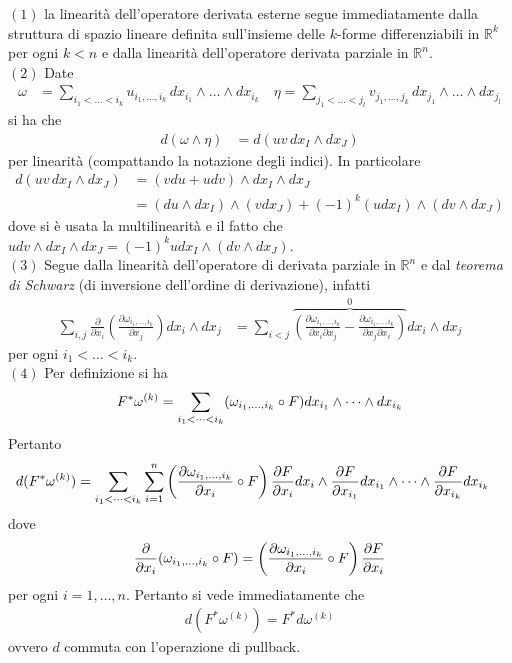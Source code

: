 \documentclass[oneside, 11pt]{amsbook}
\makeatletter
\newcommand{\0}{{(0)}}
\newcommand{\3}{{(3)}}
\theoremstyle{colonplain}
\theoremstyle{colondefinition}
\theoremstyle{colonremark}
\numberwithin{equation}{chapter}
\renewcommand{\proofname}{Dimostrazione}
\renewenvironment{proof}[1][\proofname]{\par
  \pushQED{\qed}%
  \normalfont \topsep6\p@\@plus6\p@\relax
  \trivlist
  \item[\hskip\labelsep\bfseries #1:]\ignorespaces
}{%
  \popQED\endtrivlist\@endpefalse
}
\makeatother
\begin{document}
\begin{proof} $(1)$ la linearità dell'operatore derivata esterne segue immediatamente dalla struttura di spazio lineare definita sull'insieme delle $k$-forme differenziabili in $\mathbb{R}^k$ per ogni $k < n$ e dalla linearità dell'operatore derivata parziale in $\mathbb{R}^n$. \\
$(2)$ Date
\begin{align}
    \omega &= \sum_{i_1 < \dots < i_k} u_{i_1, \dots, i_k} \, dx_{i_1} \wedge \dots \wedge dx_{i_k} \quad \eta = \sum_{j_1 < \dots < j_l} v_{j_1, \dots, j_k} \, dx_{j_1} \wedge \dots \wedge dx_{j_l}
\end{align}
si ha che
\begin{align}
    d(\omega \wedge \eta) &= d(uv \, dx_I \wedge dx_J)
\end{align}
per linearità (compattando la notazione degli indici). In particolare
\begin{align}
    d(uv \, dx_I \wedge dx_J) &= (vdu + udv) \wedge dx_I \wedge dx_J \\
    &= (du \wedge dx_I) \wedge (vdx_J) + (-1)^k(udx_I) \wedge (dv \wedge dx_J)
\end{align}
dove si è usata la multilinearità e il fatto che $udv \wedge dx_I \wedge dx_J = (-1)^k udx_I \wedge (dv \wedge dx_J)$. \\
$(3)$ Segue dalla linearità dell'operatore di derivata parziale in $\mathbb{R}^n$ e dal \textit{teorema di Schwarz} (di inversione dell'ordine di derivazione), infatti
\begin{align}
    \sum_{i, j}\frac{\partial}{\partial x_i}\left(\frac{\partial \omega_{i_1, \dots, i_k}}{\partial x_j}\right)dx_i \wedge dx_j &= \sum_{i < j}\overbrace{\left(\frac{\partial \omega_{i_1, \dots, i_k}}{\partial x_i\partial x_j} - \frac{\partial \omega_{i_1, \dots, i_k}}{\partial x_j \partial x_i}\right)}^{0}dx_i \wedge dx_j
\end{align}
per ogni $i_1 < \dots < i_k$. \\
$(4)$ Per definizione si ha
\begin{align}
    F^*\omega^{(k)} = \sum_{i_1 < \dots < i_k} (\omega_{i_1, \dots, i_k} \circ F) dx_{i_1} \wedge \dots \wedge dx_{i_k} \notag
\end{align}
Pertanto
\begin{align}
    d(F^*\omega^{(k)}) &= \sum_{i_1 < \dots < i_k}\sum_{i = 1}^n \left(\frac{\partial \omega_{i_1, \dots, i_k}}{\partial x_i} \circ F\right)\frac{\partial F}{\partial x_i} dx_i \wedge \frac{\partial F}{\partial x_{i_1}}dx_{i_1} \wedge \dots \wedge \frac{\partial F}{\partial x_{i_k}}dx_{i_k} \notag
\end{align}
dove
\begin{align}
    \frac{\partial}{\partial x_i}(\omega_{i_1, \dots, i_k} \circ F) = \left(\frac{\partial \omega_{i_1, \dots, i_k}}{\partial x_i} \circ F\right)\frac{\partial F}{\partial x_i} \notag
\end{align}
per ogni $i = 1, \dots, n$. Pertanto si vede immediatamente che
\begin{align}
    d(F^*\omega^{(k)}) = F^*d\omega^{(k)}
\end{align}
ovvero $d$ commuta con l'operazione di pullback.
\end{proof}
\end{document}

